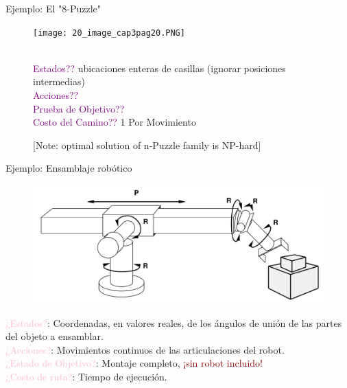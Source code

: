 \documentclass{beamer}
\theoremstyle{definition}
\theoremstyle{theorem}
\theoremstyle{remark}
\begin{document}
\begin{frame}{Ejemplo: El "8-Puzzle"}
    \begin{figure}
        \centering
        \texttt{[image: 20\_image\_cap3pag20.PNG]}
        \begin{flushleft}
            \\ \textcolor{purple}{Estados??} ubicaciones enteras de casillas (ignorar posiciones intermedias)
            \\\textcolor{purple}{Acciones??}
            \\\textcolor{purple}{Prueba de Objetivo??}
            \\\textcolor{purple}{Costo del Camino??} 1 Por Movimiento
                    
            [Note: optimal solution of n-Puzzle family is NP-hard]
        \end{flushleft}
    \end{figure}{}
        
\end{frame}


\begin{frame}{Ejemplo: Ensamblaje robótico}
    \begin{figure}
        \centering
        \includegraphics[scale=0.23]{24_chap3_pag24.png}
    \end{figure}
    \begin{flushleft}
        \textcolor{Pink}{¿Estados?}: Coordenadas, en valores reales, de los ángulos de unión de las partes del objeto a ensamblar.\\
        \textcolor{Pink}{¿Acciones?}: Movimientos continuos de las articulaciones del
        robot.\\
        \textcolor{Pink}{¿Estado de Objetivo?}: Montaje completo,
        \textcolor{DarkRed}{¡sin robot incluido!}\\
        \textcolor{Pink}{¿Costo de ruta?}: Tiempo de ejecución.
    \end{flushleft}
\end{frame}
\end{document}
